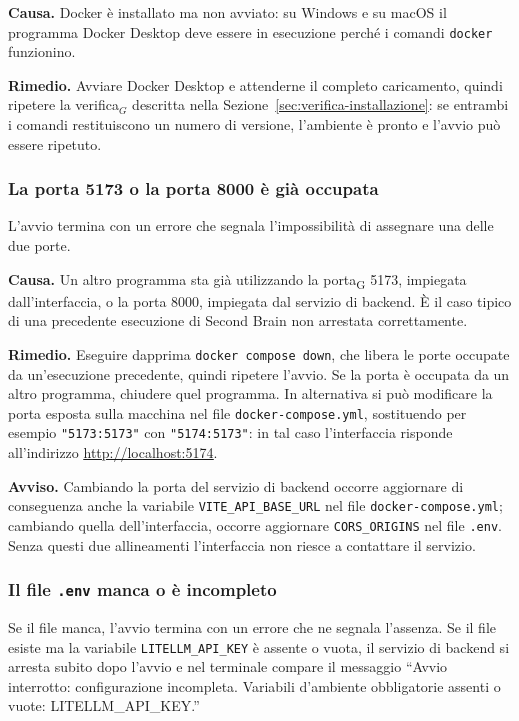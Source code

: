\documentclass[a4paper, 10pt]{article}
\newcommand{\link}[1]{\uline{\url{#1}}}
\begin{document}
\textbf{Causa.} Docker è installato ma non avviato: su Windows e su macOS il programma Docker Desktop deve essere in esecuzione perché i comandi \texttt{docker} funzionino.

\textbf{Rimedio.} Avviare Docker Desktop e attenderne il completo caricamento, quindi ripetere la verifica$_G$ descritta nella Sezione~\ref{sec:verifica-installazione}: se entrambi i comandi restituiscono un numero di versione, l'ambiente è pronto e l'avvio può essere ripetuto.

\subsubsection{La porta 5173 o la porta 8000 è già occupata}
L'avvio termina con un errore che segnala l'impossibilità di assegnare una delle due porte.

\textbf{Causa.} Un altro programma sta già utilizzando la porta\textsubscript{G} 5173, impiegata dall'interfaccia, o la porta 8000, impiegata dal servizio di backend. È il caso tipico di una precedente esecuzione di Second Brain non arrestata correttamente.

\textbf{Rimedio.} Eseguire dapprima \texttt{docker compose down}, che libera le porte occupate da un'esecuzione precedente, quindi ripetere l'avvio. Se la porta è occupata da un altro programma, chiudere quel programma. In alternativa si può modificare la porta esposta sulla macchina nel file \texttt{docker-compose.yml}, sostituendo per esempio \texttt{"5173:5173"} con \texttt{"5174:5173"}: in tal caso l'interfaccia risponde all'indirizzo \link{http://localhost:5174}.

\vspace{0.5em}

\noindent
\textbf{Avviso.} Cambiando la porta del servizio di backend occorre aggiornare di conseguenza anche la variabile \texttt{VITE\_API\_BASE\_URL} nel file \texttt{docker-compose.yml}; cambiando quella dell'interfaccia, occorre aggiornare \texttt{CORS\_ORIGINS} nel file \texttt{.env}. Senza questi due allineamenti l'interfaccia non riesce a contattare il servizio.

\subsubsection{Il file \texttt{.env} manca o è incompleto}
Se il file manca, l'avvio termina con un errore che ne segnala l'assenza. Se il file esiste ma la variabile \texttt{LITELLM\_API\_KEY} è assente o vuota, il servizio di backend si arresta subito dopo l'avvio e nel terminale compare il messaggio ``Avvio interrotto: configurazione incompleta. Variabili d'ambiente obbligatorie assenti o vuote: LITELLM\_API\_KEY.''
\end{document}
